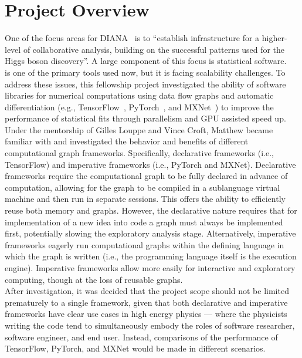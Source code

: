 \section{Project Overview}

One of the focus areas for DIANA~\cite{DIANA-proposal-2014} is to ``establish infrastructure for a higher-level of collaborative analysis, building on the successful patterns used for the Higgs boson discovery''.
A large component of this focus is statistical software.
~\cite{Verkerke:2003ir} is one of the primary tools used now, but it is facing scalability challenges.
To address these issues, this fellowship project investigated the ability of software libraries for numerical computations using data flow graphs and automatic differentiation (e.g., TensorFlow~\cite{tensorflow2015-whitepaper}, PyTorch~\cite{paszke2017automatic}, and MXNet~\cite{DBLP:journals/corr/ChenLLLWWXXZZ15}) to improve the performance of statistical fits through parallelism and GPU assisted speed up.\\

Under the mentorship of Gilles Louppe and Vince Croft, Matthew became familiar with and investigated the behavior and benefits of different computational graph frameworks.
Specifically, declarative frameworks (i.e., TensorFlow) and imperative frameworks (i.e., PyTorch and MXNet).
Declarative frameworks require the computational graph to be fully declared in advance of computation, allowing for the graph to be compiled in a sublanguage virtual machine and then run in separate sessions.
This offers the ability to efficiently reuse both memory and graphs.
However, the declarative nature requires that for implementation of a new idea into code a graph must always be implemented first, potentially slowing the exploratory analysis stage.
Alternatively, imperative frameworks eagerly run computational graphs within the defining language in which the graph is written (i.e., the programming language itself is the execution engine).
Imperative frameworks allow more easily for interactive and exploratory computing, though at the loss of reusable graphs.~\cite{Chintala:2302087}\\

After investigation, it was decided that the project scope should not be limited prematurely to a single framework, given that both declarative and imperative frameworks have clear use cases in high energy physics --- where the physicists writing the code tend to simultaneously embody the roles of software researcher, software engineer, and end user.
Instead, comparisons of the performance of TensorFlow, PyTorch, and MXNet would be made in different scenarios.\\

